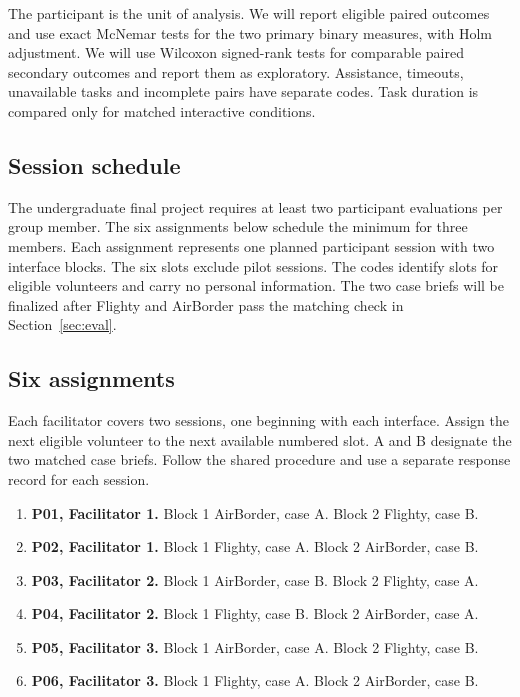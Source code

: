 \documentclass[sigconf,nonacm,balance=false]{acmart}
\begin{document}
The participant is the unit of analysis. We will report eligible paired outcomes and use exact McNemar tests for the two primary binary measures, with Holm adjustment. We will use Wilcoxon signed-rank tests for comparable paired secondary outcomes and report them as exploratory. Assistance, timeouts, unavailable tasks and incomplete pairs have separate codes. Task duration is compared only for matched interactive conditions.

\subsection{Session schedule}
The undergraduate final project requires at least two participant evaluations per group member. The six assignments below schedule the minimum for three members. Each assignment represents one planned participant session with two interface blocks. The six slots exclude pilot sessions. The codes identify slots for eligible volunteers and carry no personal information. The two case briefs will be finalized after Flighty and AirBorder pass the matching check in Section~\ref{sec:eval}.

\subsection{Six assignments}
Each facilitator covers two sessions, one beginning with each interface. Assign the next eligible volunteer to the next available numbered slot. A and B designate the two matched case briefs. Follow the shared procedure and use a separate response record for each session.

\begin{enumerate}
\item \textbf{P01, Facilitator 1.} Block 1 AirBorder, case A. Block 2 Flighty, case B.
\item \textbf{P02, Facilitator 1.} Block 1 Flighty, case A. Block 2 AirBorder, case B.
\item \textbf{P03, Facilitator 2.} Block 1 AirBorder, case B. Block 2 Flighty, case A.
\item \textbf{P04, Facilitator 2.} Block 1 Flighty, case B. Block 2 AirBorder, case A.
\item \textbf{P05, Facilitator 3.} Block 1 AirBorder, case A. Block 2 Flighty, case B.
\item \textbf{P06, Facilitator 3.} Block 1 Flighty, case A. Block 2 AirBorder, case B.
\end{enumerate}
\end{document}
